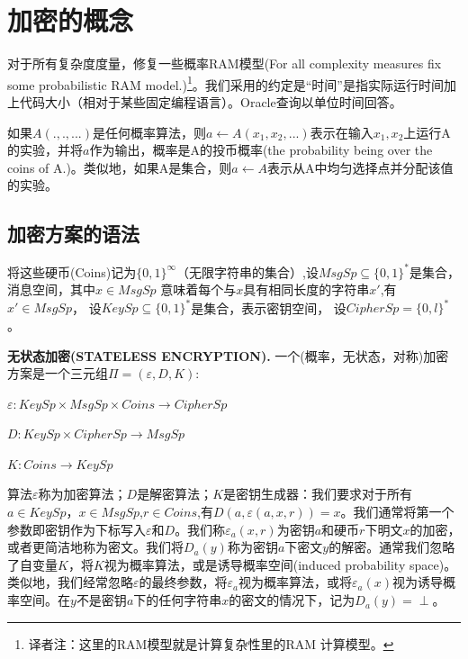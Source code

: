 \documentclass[]{article}
\begin{document}
\section{加密的概念}
对于所有复杂度度量，修复一些概率RAM模型(For all complexity measures fix some probabilistic RAM
model.)\footnote{译者注：这里的RAM模型就是计算复杂性里的RAM 计算模型。}。我们采用的约定是“时间”是指实际运行时间加上代码大小（相对于某些固定编程语言）。Oracle查询以单位时间回答。\par

如果$A(.,.,...)$是任何概率算法，则$a\leftarrow A(x_1,x_2,...)$表示在输入$x_1,x_2$上运行A的实验，并将$a$作为输出，概率是A的投币概率(the probability being over the coins of A.)。类似地，如果A是集合，则$a\leftarrow A$表示从A中均匀选择点并分配该值的实验。

\subsection{加密方案的语法}
将这些硬币(Coins)记为$\{0,1\}^\infty$（无限字符串的集合）,设$MsgSp\subseteq \{0,1\}^*$是集合，消息空间，其中$x\in MsgSp$ 意味着每个与$x$具有相同长度的字符串$x'$,有$x'\in MsgSp$， 设$KeySp\subseteq \{0,1\}^*$是集合，表示密钥空间， 设$CipherSp=\{0,l\}^*$。
\par

 \textbf{\large{无状态加密(STATELESS ENCRYPTION).}} 一个(概率，无状态，对称)加密方案是一个三元组$\Pi=(\varepsilon,D,K)$:\par
 
$\varepsilon : KeySp\times MsgSp \times Coins\rightarrow CipherSp$\par
$D : KeySp\times CipherSp \rightarrow MsgSp$\par
$K :  Coins\rightarrow KeySp$\par

算法$\varepsilon$称为加密算法；$D$是解密算法；$K$是密钥生成器：我们要求对于所有$a\in KeySp$，$x\in MsgSp$,$r\in Coins$,有$D(a,\varepsilon(a,x,r))=x$。我们通常将第一个参数即密钥作为下标写入$\varepsilon$和$D$。我们称$\varepsilon_a(x,r)$为密钥$a$和硬币$r$下明文$x$的加密，或者更简洁地称为密文。我们将$D_a(y)$称为密钥$a$下密文$y$的解密。通常我们忽略了自变量$K$，将$K$视为概率算法，或是诱导概率空间(induced probability space)\footnotemark。类似地，我们经常忽略$\varepsilon$的最终参数，将$\varepsilon_a$视为概率算法，或将$\varepsilon_a(x)$视为诱导概率空间。在$y$不是密钥$a$下的任何字符串$x$的密文的情况下，记为$D_a(y)=\perp$。
\end{document}
